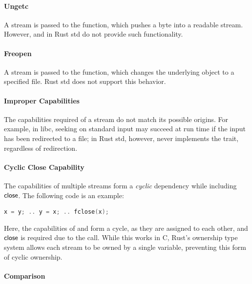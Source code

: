 \paragraph{Ungetc}

A stream is passed to the  function, which pushes a byte into a
readable stream.
%
However,  and  in Rust std do not provide such functionality.

\paragraph{Freopen}

A stream is passed to the  function, which changes the underlying
object to a specified file.
%
Rust std does not support this behavior.

\paragraph{Improper Capabilities}

The capabilities required of a stream do not match its possible origins.
%
For example, in libc, seeking on standard input may succeed at run time if the
input has been redirected to a file;
%
in Rust std, however,  never implements the  trait, regardless
of redirection.

\paragraph{Cyclic Close Capability}

The capabilities of multiple streams form a \emph{cyclic} dependency while
including ${\sf close}$. The following code is an example:

\vspace{-0.25em}
\begin{lstlisting}[language=C]
x = y; .. y = x; .. fclose(x);
\end{lstlisting}
\vspace{-0.25em}

\noindent
%
Here, the capabilities of  and  form a cycle, as they are assigned to
each other, and ${\sf close}$ is required due to the  call.
%
While this works in C, Rust's ownership type system allows each stream to be
owned by a single variable, preventing this form of cyclic ownership.

\paragraph{Comparison}

